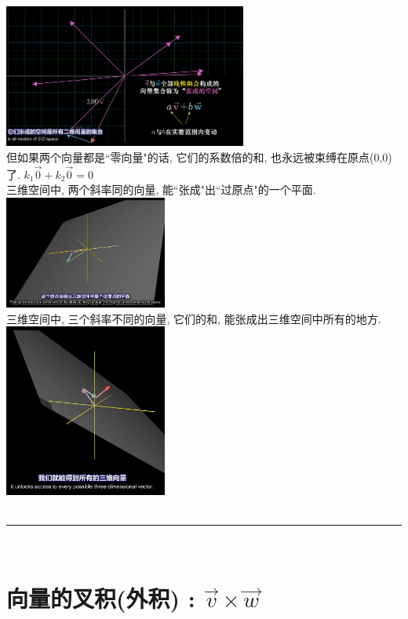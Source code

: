 \documentclass[UTF8]{ctexart}
\begin{document}
\includegraphics[width=0.6\textwidth]{img/0070.png}\\

但如果两个向量都是``零向量"的话, 它们的系数倍的和, 也永远被束缚在原点(0,0)了. $ k_1 \vec{0}  +  k_2 \vec{0}=0$ \\

三维空间中, 两个斜率同的向量, 能``张成"出``过原点"的一个平面.\\
\includegraphics[width=0.4\textwidth]{img/0071.png}\\

三维空间中, 三个斜率不同的向量, 它们的和, 能张成出三维空间中所有的地方. \\
\includegraphics[width=0.4\textwidth]{img/0072.png}\\


~\\
\hrule
~\\

\section{向量的叉积(外积) : $\vec{v} \times \vec{w}$}
\end{document}
